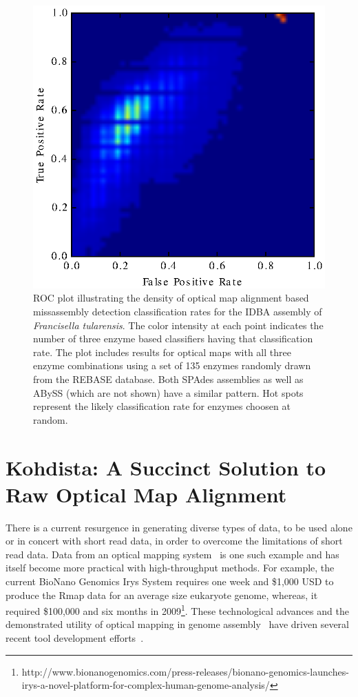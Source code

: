 \documentclass[doctor]{thesis}
\begin{document}
        \begin{figure}[h!]
            \centering
              	\includegraphics[scale=.9]{recomb15mis/idba.eps}
                	\caption{ROC plot illustrating the density of optical map alignment based missassembly detection classification rates for the IDBA assembly of {\em Francisella tularensis}. The color intensity at each point indicates the number of three enzyme based classifiers having that classification rate. The plot includes results for optical maps with all three enzyme combinations using a set of 135 enzymes randomly drawn from the REBASE database.  Both SPAdes assemblies as well as ABySS (which are not shown) have a similar pattern. Hot spots represent the likely classification rate for enzymes choosen at random.}
                	\label{fig:idba_roc}
        \end{figure}
 

\chapter{Kohdista: A Succinct Solution to Raw Optical Map Alignment}

\makeatletter{}


There is a current resurgence in generating diverse types of data, to be used alone or in concert with short read data, in order to overcome the limitations of short read data.  Data from an optical mapping system~\cite{ORMenc,microfluidic} is one such example and has itself become more practical with high-throughput methods.  For example, the current BioNano Genomics Irys System requires one week and \$1,000 USD to produce the Rmap data for an average size eukaryote genome, whereas, it required \$100,000 and six months in 2009\footnote{http://www.bionanogenomics.com/press-releases/bionano-genomics-launches-irys-a-novel-platform-for-complex-human-genome-analysis/}. These technological advances and the demonstrated utility of optical mapping in genome assembly~\cite{reslewic,zhou,zhou2,amborella,GOAT} have driven several recent tool development efforts~\cite{optima,omblast,maligner}.
\end{document}
